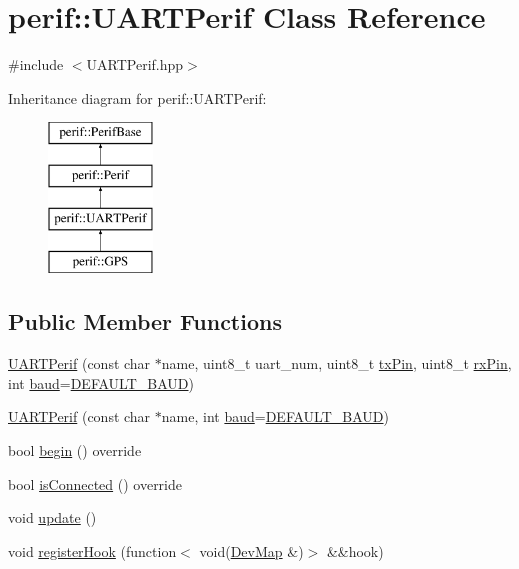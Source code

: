 \hypertarget{classperif_1_1UARTPerif}{}\section{perif\+::U\+A\+R\+T\+Perif Class Reference}
\label{classperif_1_1UARTPerif}


{\ttfamily \#include $<$U\+A\+R\+T\+Perif.\+hpp$>$}

Inheritance diagram for perif\+::U\+A\+R\+T\+Perif\+:\begin{figure}[H]
\begin{center}
\leavevmode
\includegraphics[height=4.000000cm]{classperif_1_1UARTPerif}
\end{center}
\end{figure}
\subsection*{Public Member Functions}
\begin{DoxyCompactItemize}
\item 
\mbox{\hyperlink{classperif_1_1UARTPerif_a51d653db806b884f36cc0e9136355e3b}{U\+A\+R\+T\+Perif}} (const char $\ast$name, uint8\+\_\+t uart\+\_\+num, uint8\+\_\+t \mbox{\hyperlink{classperif_1_1UARTPerif_a338fb2e5db8bd91213b13524ac9d89aa}{tx\+Pin}}, uint8\+\_\+t \mbox{\hyperlink{classperif_1_1UARTPerif_a68a86b1e2ca06e42ef72fb4ca0792110}{rx\+Pin}}, int \mbox{\hyperlink{classperif_1_1UARTPerif_a8d5c1c0ce1f1758392dc0145f0caade8}{baud}}=\mbox{\hyperlink{UARTPerif_8hpp_ae9dc3b6e28948a9d8788412ce6a603cb}{D\+E\+F\+A\+U\+L\+T\+\_\+\+B\+A\+UD}})
\item 
\mbox{\hyperlink{classperif_1_1UARTPerif_af85b7a0dd0877182024266ad631cd39b}{U\+A\+R\+T\+Perif}} (const char $\ast$name, int \mbox{\hyperlink{classperif_1_1UARTPerif_a8d5c1c0ce1f1758392dc0145f0caade8}{baud}}=\mbox{\hyperlink{UARTPerif_8hpp_ae9dc3b6e28948a9d8788412ce6a603cb}{D\+E\+F\+A\+U\+L\+T\+\_\+\+B\+A\+UD}})
\item 
bool \mbox{\hyperlink{classperif_1_1UARTPerif_ac060109ead3a8910fabe57304afe1dbb}{begin}} () override
\item 
bool \mbox{\hyperlink{classperif_1_1UARTPerif_a14c1fdcd81cd9a5eac9d4c0ac9863b66}{is\+Connected}} () override
\item 
void \mbox{\hyperlink{classperif_1_1Perif_ad6fe1a13354bba4af4cc2751399ed93c}{update}} ()
\item 
void \mbox{\hyperlink{classperif_1_1PerifBase_a2e8bcc221ee253b21b61c7c07307d931}{register\+Hook}} (function$<$ void(\mbox{\hyperlink{Perif_8hpp_a358ff4ee6d24694ee7661f0cce14377e}{Dev\+Map}} \&)$>$ \&\&hook)
\end{DoxyCompactItemize}
